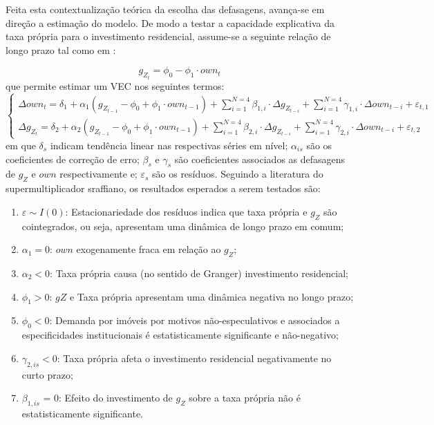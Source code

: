 Feita esta contextualização teórica da escolha das defasagens, avança-se em direção a estimação do modelo. De modo a testar a capacidade explicativa da taxa própria para o investimento residencial, assume-se a seguinte relação de longo prazo tal como em \textcite{teixeira_crescimento_2015}:

\begin{equation}
g_{Z_t} = \phi_0 - \phi_1\cdot own_t
\end{equation}
que permite estimar um VEC nos seguintes termos:
\begin{equation}
\begin{cases}
\Delta own_t = \delta_{1} + \alpha_1(g_{Z_{t-1}} - \phi_0 + \phi_1\cdot own_{t-1}) + \sum^{N=4}_{i=1}\beta_{1,i}\cdot \Delta g_{Z_{t-i}} +
\sum^{N=4}_{i=1}\gamma_{1,i}\cdot \Delta own_{t-i} +\varepsilon_{t,1}
\\
\Delta g_{Z_{t}} = \delta_{2} + \alpha_2(g_{Z_{t-1}} - \phi_0 + \phi_1\cdot own_{t-1}) + \sum^{N=4}_{i=1}\beta_{2,i}\cdot \Delta g_{Z_{t-i}} +
\sum^{N=4}_{i=1}\gamma_{2,i}\cdot \Delta own_{t-i} +\varepsilon_{t,2}
\end{cases}
\end{equation}
em que $\delta_s$ indicam tendência linear nas respectivas séries em nível;
$\alpha_{is}$ são os coeficientes de correção de erro; 
$\beta_s$ e $\gamma_s$ são coeficientes associados as defasagens de  $g_Z$ e $own$ respectivamente e; $\varepsilon_s$ são os resíduos.
Seguindo a literatura do supermultiplicador sraffiano, os resultados esperados a serem testados são:
\begin{enumerate}
\item $\varepsilon \sim I(0)$: Estacionariedade dos resíduos indica que taxa própria e $g_Z$ são cointegrados, ou seja, apresentam uma dinâmica de longo prazo em comum;
\item $\alpha_1 = 0$: $own$ exogenamente fraca em relação ao $g_Z$;
\item $\alpha_2 < 0$: Taxa própria causa (no sentido de Granger) investimento residencial;
\item $\phi_1 > 0$: $gZ$ e Taxa própria apresentam uma dinâmica negativa no longo prazo;
\item $\phi_0 < 0$: Demanda por imóveis por motivos não-especulativos e associados a especificidades institucionais é estatisticamente significante e não-negativo;
\item $\gamma_{2,is} < 0$: Taxa própria afeta o investimento residencial negativamente no curto prazo;
\item $\beta_{1,is}$ = 0: Efeito do investimento de $g_Z$ sobre a taxa própria não é estatisticamente significante.
\end{enumerate}






